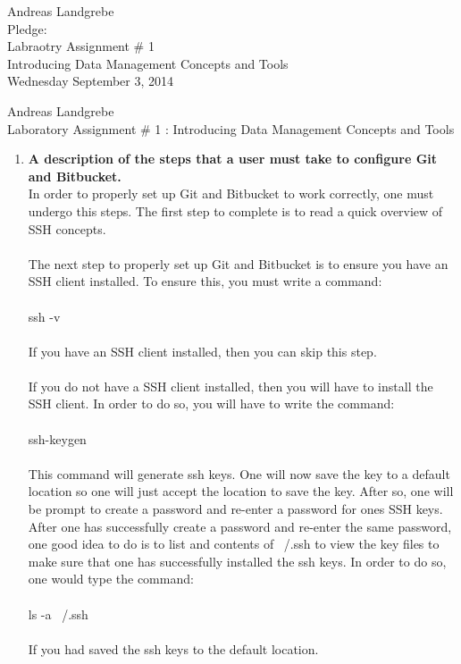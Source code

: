 \documentclass{article}
\begin{document}
\begin{center}
\Large
Andreas Landgrebe
\\
Pledge:
\\
Labraotry Assignment \# 1 
\\
Introducing Data Management Concepts and Tools
\\
Wednesday September 3, 2014
\\
\end{center}
\newpage
\noindent
Andreas Landgrebe
\\
Laboratory Assignment \# 1 : Introducing Data Management Concepts and Tools
\begin{enumerate}
\item \textbf{{A description of the steps that a user must take to configure Git and Bitbucket.}}
\\
In order to properly set up Git and Bitbucket to work correctly, one must undergo this steps. The first step to complete is to read a quick overview of SSH concepts.
\\
\\
The next step to properly set up Git and Bitbucket is to ensure you have an SSH client installed. To ensure this, you must write a command:
\\
\\
ssh -v
\\
\\
If you have an SSH client installed, then you can skip this step.
\\
\\
If you do not have a SSH client installed, then you will have to install the SSH client. In order to do so, you will have to write the command:
\\
\\
ssh-keygen
\\
\\
This command will generate ssh keys. One will now save the key to a default location so one will just accept the location to save the key. After so, one will be prompt to create a password and re-enter a password for ones SSH keys. After one has successfully create a password and re-enter the same password, one good idea to do is to list and contents of ~/.ssh to view the key files to make sure that one has successfully installed the ssh keys. In order to do so, one would type the command:
\\
\\
ls -a ~/.ssh
\\
\\
If you had saved the ssh keys to the default location.

\end{enumerate}
\end{document}

